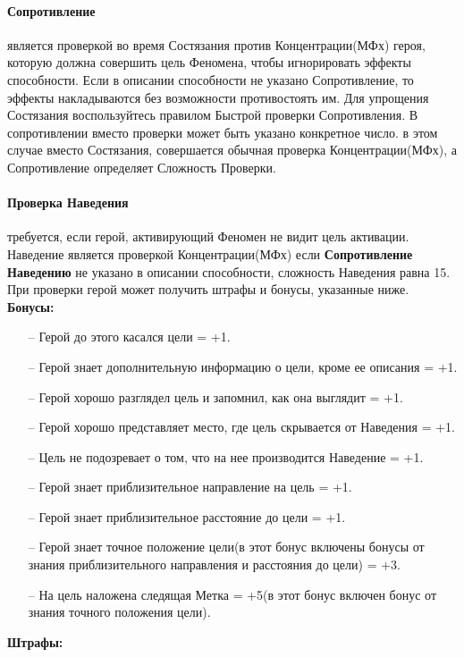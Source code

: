 \paragraph{Сопротивление} является проверкой во время Состязания против Концентрации(МФх) героя, которую должна совершить цель Феномена, чтобы игнорировать эффекты способности. Если в описании способности не указано Сопротивление, то эффекты накладываются без возможности противостоять им. Для упрощения Состязания воспользуйтесь правилом Быстрой проверки Сопротивления. В сопротивлении вместо проверки может быть указано конкретное число. в этом случае вместо Состязания, совершается обычная проверка Концентрации(МФх), а Сопротивление определяет Сложность Проверки.


\paragraph{Проверка Наведения} требуется, если герой, активирующий Феномен не видит цель активации. Наведение является проверкой Концентрации(МФх) если \textbf{Сопротивление Наведению} не указано в описании способности, сложность Наведения равна 15. При проверки герой может получить штрафы и бонусы, указанные ниже.
\newline
\textbf{Бонусы:}
\begin{itemize}
\item[--]Герой до этого касался цели = +1.
\item[--]Герой знает дополнительную информацию о цели, кроме ее описания = +1.
\item[--]Герой хорошо разглядел цель и запомнил, как она выглядит = +1.
\item[--]Герой хорошо представляет место, где цель скрывается от Наведения = +1.
\item[--]Цель не подозревает о том, что на нее производится Наведение = +1.
\item[--]Герой знает приблизительное направление на цель = +1.
\item[--]Герой знает приблизительное расстояние до цели = +1.
\item[--]Герой знает точное положение цели(в этот бонус включены бонусы от знания приблизительного направления и расстояния до цели) = +3.
\item[--]На цель наложена следящая Метка = +5(в этот бонус включен бонус от знания точного положения цели).

\end{itemize}
\textbf{Штрафы:}
